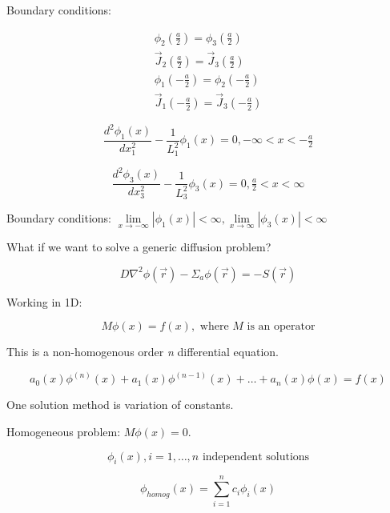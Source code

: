 \documentclass[12pt]{article}
\newcommand{\rvec}{\ensuremath{\vec{r}}}
\begin{document}
Boundary conditions:

\begin{gather*}
\phi_2(\tfrac{a}{2}) = \phi_3(\tfrac{a}{2}) \\
\vec{J}_2(\tfrac{a}{2}) = \vec{J}_3(\tfrac{a}{2}) \\
\phi_1(-\tfrac{a}{2}) = \phi_2(-\tfrac{a}{2}) \\
\vec{J}_1(-\tfrac{a}{2}) = \vec{J}_3(-\tfrac{a}{2}) 
\end{gather*}

\begin{equation*}
\frac{d^2\phi_1(x)}{dx_1^2} - \frac{1}{L_1^2}\phi_1(x) = 0, -\infty<x<-\tfrac{a}{2}
\end{equation*}

\begin{equation*}
\frac{d^2\phi_3(x)}{dx_3^2} - \frac{1}{L_3^2}\phi_3(x) = 0, \tfrac{a}{2}<x<\infty
\end{equation*}

Boundary conditions: 
$\lim\limits_{x\to-\infty}|\phi_1(x)| <\infty, \lim\limits_{x\to\infty}|\phi_3(x)| < \infty$

What if we want to solve a generic diffusion problem?

\begin{equation*}
D\nabla^2\phi(\rvec) - \Sigma_a\phi(\rvec) = -S(\rvec)
\end{equation*}

Working in 1D:

\begin{equation*}
M\phi(x) = f(x),\text{ where $M$ is an operator}
\end{equation*}

This is a non-homogenous order \emph{n} differential equation.

\begin{equation*}
a_0(x)\phi^{(n)}(x) + a_1(x)\phi^{(n-1)}(x) + \dotsc + a_n(x)\phi(x) = f(x)
\end{equation*}

One solution method is variation of constants.


Homogeneous problem: $M\phi(x) = 0$.

\begin{equation*}
\phi_i(x), i = 1,\dotsc, n \text{ independent solutions}
\end{equation*}

\begin{equation*}
\phi_{homog}(x) = \sum_{i=1}^n c_i\phi_i(x)
\end{equation*}
\end{document}
